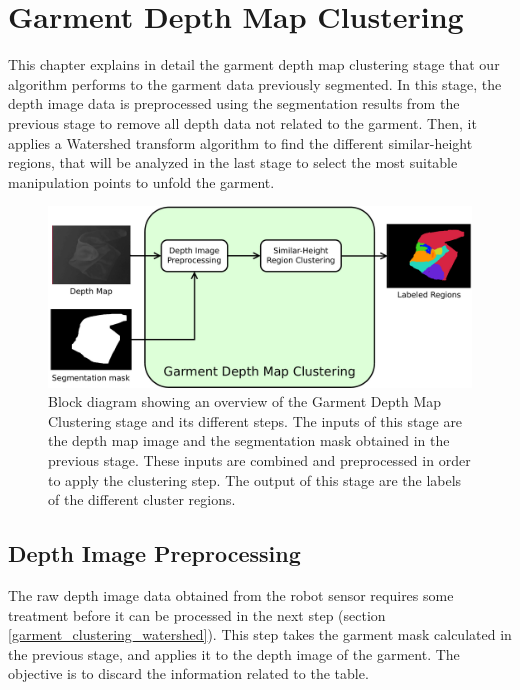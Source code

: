 \chapter{Garment Depth Map Clustering}
\label{garment_clustering}

This chapter explains in detail the garment depth map clustering stage that our algorithm performs to the garment data previously segmented. In this stage, the depth image data is preprocessed using the segmentation results from the previous stage to remove all depth data not related to the garment. Then, it applies a Watershed transform algorithm to find the different similar-height regions, that will be analyzed in the last stage to select the most suitable manipulation points to unfold the garment. 

\begin{figure}[thpb]
    \centering
    \includegraphics[width=\textwidth]
    {figures/Garment-depthmap-diagram.pdf}
    \caption{Block diagram showing an overview of the Garment Depth Map Clustering stage and its different steps. The inputs of this stage are the depth map image and the segmentation mask obtained in the previous stage. These inputs are combined and preprocessed in order to apply the clustering step. The output of this stage are the labels of the different cluster regions.}
    \label{fig:garment_clustering_blocks}
\end{figure}

\section{Depth Image Preprocessing}
\label{depth_image_preprocessing}

The raw depth image data obtained from the robot sensor requires some treatment before it can be processed in the next step (section \ref{garment_clustering_watershed}). This step takes the garment mask calculated in the previous stage, and applies it to the depth image of the garment. The objective is to discard the information related to the table. 

